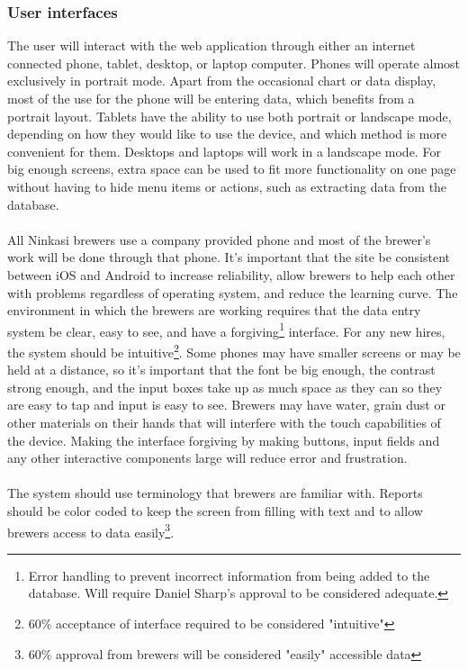 \documentclass[draftclsnofoot,onecolumn,letterpaper,10pt,compsoc]{IEEEtran}
\begin{document}
		\subsubsection{User interfaces}
			The user will interact with the web application through either an internet connected phone, tablet, desktop, or laptop computer.
			Phones will operate almost exclusively in portrait mode.
			Apart from the occasional chart or data display, most of the use for the phone will be entering data, which benefits from a portrait layout.
			Tablets have the ability to use both portrait or landscape mode, depending on how they would like to use the device, and which method is more convenient for them.
			Desktops and laptops will work in a landscape mode.
			For big enough screens, extra space can be used to fit more functionality on one page without having to hide menu items or actions, such as extracting data from the database.
			\\
			\\
			All Ninkasi brewers use a company provided phone and most of the brewer's work will be done through that phone.
			It's important that the site be consistent between iOS and Android to increase reliability, allow brewers to help each other with problems regardless of operating system, and reduce the learning curve.
			The environment in which the brewers are working requires that the data entry system be clear, easy to see, and have a forgiving\footnote{Error handling to prevent incorrect information from being added to the database. Will require Daniel Sharp's approval to be considered adequate.} interface.
			For any new hires, the system should be intuitive\footnote{60\% acceptance of interface required to be considered "intuitive"}.
			Some phones may have smaller screens or may be held at a distance, so it's important that the font be big enough, the contrast strong enough, and the input boxes take up as much space as they can so they are easy to tap and input is easy to see.
			Brewers may have water, grain dust or other materials on their hands that will interfere with the touch capabilities of the device.
			Making the interface forgiving by making buttons, input fields and any other interactive components large will reduce error and frustration.
			\\
			\\
			The system should use terminology that brewers are familiar with.
			Reports should be color coded to keep the screen from filling with text and to allow brewers access to data easily\footnote{60\% approval from brewers will be considered "easily" accessible data}.
\end{document}
